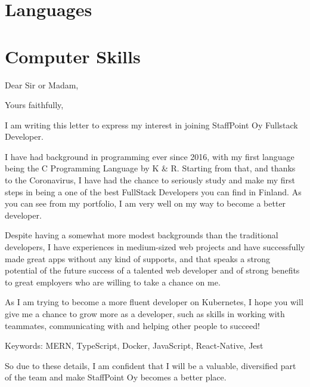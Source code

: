 \documentclass[11pt,a4paper,sans]{moderncv}
\begin{document}
  \clearpage

  \section{Languages}

  \section{Computer Skills}

  \clearpage

  \date{February 22, 2021}
  \opening{Dear Sir or Madam,}
  \closing{Yours faithfully,}
  \makelettertitle

  I am writing this letter to express my interest in joining
  StaffPoint Oy Fullstack Developer.

  I have had background in programming ever since 2016, with my
  first language being the C Programming Language by K \& R. Starting
  from that, and thanks to the Coronavirus, I have had the chance
  to seriously study and make my first steps in being a
  one of the best FullStack Developers you can find in Finland.
  As you can see from my portfolio, I am very well on my way to become
  a better developer.

  Despite having a somewhat more modest backgrounds than the traditional developers,
  I have experiences
  in medium-sized web projects and have successfully made great apps without
  any kind of supports, and that speaks a strong potential of the future
  success of a talented web developer and of strong benefits to
  great employers who are willing to take a chance on me.

  As I am trying to become a more fluent developer on Kubernetes,
  I hope you will give me a chance to grow more as a developer,
  such as skills in working with teammates, communicating with and helping other
  people to succeed!

  Keywords: MERN, TypeScript, Docker, JavaScript, React-Native, Jest

  So due to these details, I am confident that I will be a valuable, diversified
  part of the team and make StaffPoint Oy becomes a better place.

  \makeletterclosing
\end{document}
